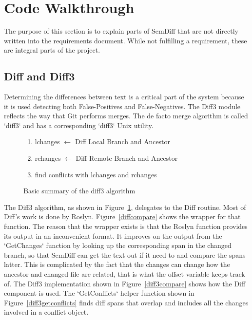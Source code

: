 \documentclass[draftclsnofoot,onecolumn]{IEEEtran}
\begin{document}
\section{Code Walkthrough}%

The purpose of this section is to explain parts of SemDiff that are not 
directly written into the requirements document. While not fulfilling a 
requirement, these are integral parts of the project.

\subsection{Diff and Diff3}%

Determining the differences between text is a critical part of the system 
because it is used detecting both False-Positives and False-Negatives. The 
Diff3 module reflects the way that Git performs merges. The de facto merge 
algorithm is called `diff3` and has a corresponding `diff3` Unix utility. 

\begin{figure}[!htb]
\centering
\begin{enumerate}
    \item lchanges $\leftarrow$ Diff Local Branch and Ancestor
    \item rchanges $\leftarrow$ Diff Remote Branch and Ancestor
    \item find conflicts with lchanges and rchanges
\end{enumerate}
\caption{Basic summary of the diff3 algorithm}
\label{diff3algorithm}
\end{figure}

The Diff3 algorithm, as shown in Figure~\ref{diff3algorithm}, delegates to 
the Diff routine. Most of Diff’s work is done by Roslyn. 
Figure~\ref{diffcompare} shows the wrapper for that function. The reason that 
the wrapper exists is that the Roslyn function provides its output in an 
inconvenient format. It improves on the output from the `GetChanges` function 
by looking up the corresponding span in the changed branch, so that SemDiff 
can get the text out if it need to and compare the spans latter. This is 
complicated by the fact that the changes can change how the ancestor and 
changed file are related, that is what the offset variable keeps track of. 
The Diff3 implementation shown in Figure~\ref{diff3compare} shows how the 
Diff component is used. The `GetConflicts` helper function shown in 
Figure~\ref{diff3getconflicts} finds diff spans that overlap and includes all 
the changes involved in a conflict object.
\end{document}
